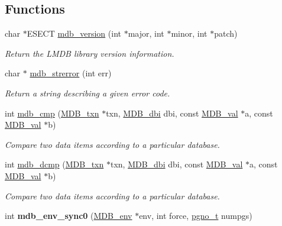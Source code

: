 \subsection*{Functions}
\begin{DoxyCompactItemize}
\item 
char $\ast$E\+S\+E\+CT \mbox{\hyperlink{group__internal_ga07dab844f4efddc9f2ce36dcb309ac9a}{mdb\+\_\+version}} (int $\ast$major, int $\ast$minor, int $\ast$patch)
\begin{DoxyCompactList}\small\item\em Return the L\+M\+DB library version information. \end{DoxyCompactList}\item 
char $\ast$ \mbox{\hyperlink{group__internal_ga569e66c1e3edc1a6016b86719ee3d098}{mdb\+\_\+strerror}} (int err)
\begin{DoxyCompactList}\small\item\em Return a string describing a given error code. \end{DoxyCompactList}\item 
int \mbox{\hyperlink{group__internal_gaba790a2493f744965b810efac73bac0e}{mdb\+\_\+cmp}} (\mbox{\hyperlink{struct_m_d_b__txn}{M\+D\+B\+\_\+txn}} $\ast$txn, \mbox{\hyperlink{group__mdb_gadbe68a06c448dfb62da16443d251a78b}{M\+D\+B\+\_\+dbi}} dbi, const \mbox{\hyperlink{struct_m_d_b__val}{M\+D\+B\+\_\+val}} $\ast$a, const \mbox{\hyperlink{struct_m_d_b__val}{M\+D\+B\+\_\+val}} $\ast$b)
\begin{DoxyCompactList}\small\item\em Compare two data items according to a particular database. \end{DoxyCompactList}\item 
int \mbox{\hyperlink{group__internal_gac61d3087282b0824c8c5caff6caabdf3}{mdb\+\_\+dcmp}} (\mbox{\hyperlink{struct_m_d_b__txn}{M\+D\+B\+\_\+txn}} $\ast$txn, \mbox{\hyperlink{group__mdb_gadbe68a06c448dfb62da16443d251a78b}{M\+D\+B\+\_\+dbi}} dbi, const \mbox{\hyperlink{struct_m_d_b__val}{M\+D\+B\+\_\+val}} $\ast$a, const \mbox{\hyperlink{struct_m_d_b__val}{M\+D\+B\+\_\+val}} $\ast$b)
\begin{DoxyCompactList}\small\item\em Compare two data items according to a particular database. \end{DoxyCompactList}\item 
\mbox{\label{group__internal_gace4271f4ff543fba23d3f2211d4f9cd1}} 
int {\bfseries mdb\+\_\+env\+\_\+sync0} (\mbox{\hyperlink{struct_m_d_b__env}{M\+D\+B\+\_\+env}} $\ast$env, int force, \mbox{\hyperlink{group__internal_gadb65f0424c9d3827bf6409087ad555cd}{pgno\+\_\+t}} numpgs)

\end{DoxyCompactItemize}
